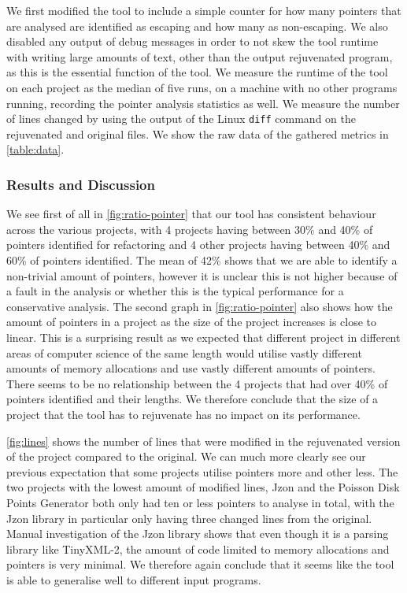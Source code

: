 \documentclass{mpaper}
\begin{document}
    We first modified the tool to include a simple counter for how many pointers that are analysed are identified as escaping and how many as non-escaping.
    We also disabled any output of debug messages in order to not skew the tool runtime with writing large amounts of text, other than the output rejuvenated program, as this is the essential function of the tool.
    We measure the runtime of the tool on each project as the median of five runs, on a machine with no other programs running, recording the pointer analysis statistics as well.
    We measure the number of lines changed by using the output of the Linux \texttt{diff} command on the rejuvenated and original files. 
    We show the raw data of the gathered metrics in \autoref{table:data}.
    
    \subsubsection{Results and Discussion}
    
    We see first of all in \autoref{fig:ratio-pointer} that our tool has consistent behaviour across the various projects, with 4 projects having between 30\% and 40\% of pointers identified for refactoring and 4 other projects having between 40\% and 60\% of pointers identified. 
    The mean of 42\% shows that we are able to identify a non-trivial amount of pointers, however it is unclear this is not higher because of a fault in the analysis or whether this is the typical performance for a conservative analysis.
    The second graph in \autoref{fig:ratio-pointer} also shows how the amount of pointers in a project as the size of the project increases is close to linear. 
    This is a surprising result as we expected that different project in different areas of computer science of the same length would utilise vastly different amounts of memory allocations and use vastly different amounts of pointers.
    There seems to be no relationship between the 4 projects that had over 40\% of pointers identified and their lengths.
    We therefore conclude that the size of a project that the tool has to rejuvenate has no impact on its performance. 
    
    \autoref{fig:lines} shows the number of lines that were modified in the rejuvenated version of the project compared to the original. 
    We can much more clearly see our previous expectation that some projects utilise pointers more and other less. 
    The two projects with the lowest amount of modified lines, Jzon and the Poisson Disk Points Generator both only had ten or less pointers to analyse in total, with the Jzon library in particular only having three changed lines from the original. 
    Manual investigation of the Jzon library shows that even though it is a parsing library like TinyXML-2, the amount of code limited to memory allocations and pointers is very minimal. 
    We therefore again conclude that it seems like the tool is able to generalise well to different input programs.
    
\end{document}
